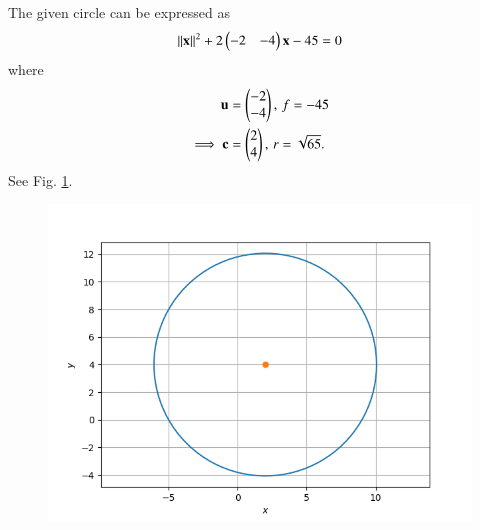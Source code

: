 The given circle can be expressed as
\begin{align}
    \label{eq:chapters/11/11/1/7/given} 
    \left\lVert\mathbf{x}\right\rVert^2  + 2\begin{pmatrix}-2 & -4\end{pmatrix}\mathbf{x} - 45 = 0
\end{align}
where
\begin{align}	
	\mathbf{u} &= \begin{pmatrix}-2\\-4\end{pmatrix},\, f = -45 \\
	\implies \mathbf{c} &= \begin{pmatrix}2\\4\end{pmatrix},\,
	r = \sqrt{65}.	
\end{align}
See Fig. 
    \ref{fig:chapters/11/11/1/7/cicle}.
\begin{figure}[!htb]
    \centering
    \includegraphics[width=\columnwidth]{chapters/11/11/1/7/figs/circle.png}
    \caption{}
    \label{fig:chapters/11/11/1/7/cicle}
\end{figure}

